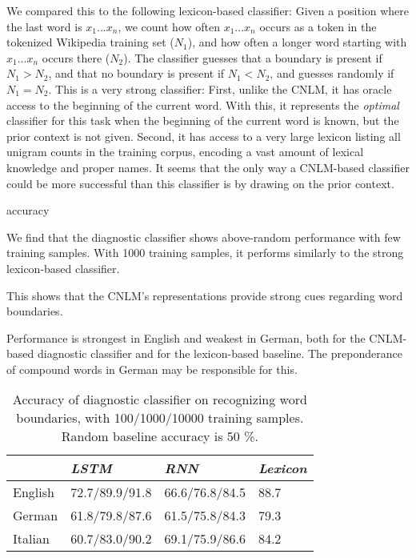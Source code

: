 We compared this to the following lexicon-based classifier:
Given a position where the last word is $x_1...x_n$, we count how often $x_1...x_n$ occurs as a token in the tokenized Wikipedia training set ($N_1$), and how often a longer word starting with $x_1...x_n$ occurs there ($N_2$).
The classifier guesses that a boundary is present if $N_1 > N_2$, and that no boundary is present if $N_1 < N_2$, and guesses randomly if $N_1 = N_2$.
This is a very strong classifier:
First, unlike the CNLM, it has oracle access to the beginning of the current word.
With this, it represents the \emph{optimal} classifier for this task when the beginning of the current word is known, but the prior context is not given.
Second, it has access to a very large lexicon listing all unigram counts in the training corpus, encoding a vast amount of lexical knowledge and proper names.
It seems that the only way a CNLM-based classifier could be more successful than this classifier is by drawing on the prior context.



accuracy


We find that the diagnostic classifier shows above-random performance with few training samples.
With 1000 training samples, it performs similarly to the strong lexicon-based classifier.

This shows that the CNLM's representations provide strong cues regarding word boundaries.

Performance is strongest in English and weakest in German, both for the CNLM-based diagnostic classifier and for the lexicon-based baseline.
The preponderance of compound words in German may be responsible for this.

\begin{table}[t]
	\small
  \begin{center}
    \begin{tabular}{l|l|l|l}
      \multicolumn{1}{c|}{}&\emph{LSTM}&\emph{RNN}&\emph{Lexicon}\\
      \hline
      English & 72.7/89.9/91.8 &  66.6/76.8/84.5  &  88.7   \\ 
      German & 61.8/79.8/87.6  &  61.5/75.8/84.3 &  79.3  \\ 
      Italian &  60.7/83.0/90.2 &  69.1/75.9/86.6  &  84.2   \\ 
    \end{tabular}
  \end{center}
  \caption{\label{tab:segmentation-results} Accuracy of diagnostic classifier on recognizing word boundaries, with 100/1000/10000 training samples. Random baseline accuracy is 50 \%.}
\end{table}


